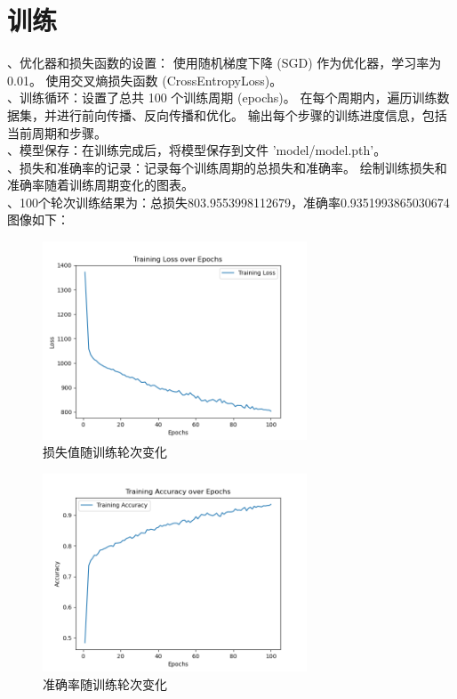 \section{训练}
、优化器和损失函数的设置： 使用随机梯度下降 (SGD) 作为优化器，学习率为 0.01。
使用交叉熵损失函数 (CrossEntropyLoss)。\\
、训练循环：设置了总共 100 个训练周期 (epochs)。
在每个周期内，遍历训练数据集，并进行前向传播、反向传播和优化。
输出每个步骤的训练进度信息，包括当前周期和步骤。\\
、模型保存：在训练完成后，将模型保存到文件 'model/model.pth'。\\
、损失和准确率的记录：记录每个训练周期的总损失和准确率。
绘制训练损失和准确率随着训练周期变化的图表。\\
、100个轮次训练结果为：总损失803.9553998112679，准确率0.9351993865030674
\noindent 图像如下：
\begin{figure}[H]
	\centering
	\includegraphics[width=0.7\textwidth]{loss_plot.png}
	\caption{损失值随训练轮次变化}
	\label{fig:example}
\end{figure}

\begin{figure}[H]
	\centering
	\includegraphics[width=0.7\textwidth]{accuracy_plot.png}
	\caption{准确率随训练轮次变化}
	\label{fig:example}
\end{figure}